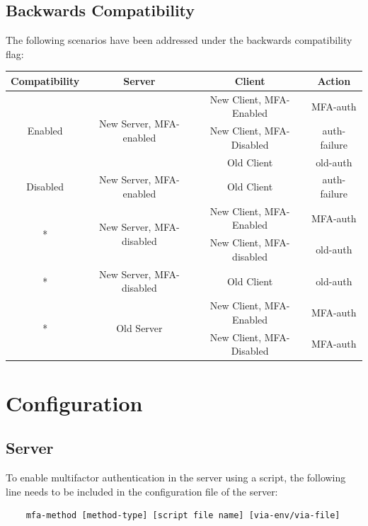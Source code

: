 \documentclass[11pt,oneside]{book}
\begin{document}
\subsection{Backwards Compatibility}
The following scenarios have been addressed under the backwards compatibility flag:\\

{
    \centering
    \begin{tabular}{|c|c|c|c|}
        \hline
        \textbf{Compatibility} & \textbf{Server} & \textbf{Client} & \textbf{Action} \\

        \hline
        \multirow{3}{*}{Enabled} & \multirow{3}{*}{New Server, MFA-enabled} & New Client, MFA-Enabled & MFA-auth\\
                                 & & New Client, MFA-Disabled & auth-failure\\
                                 & & Old Client & old-auth\\
        \hline
        Disabled & New Server, MFA-enabled & Old Client & auth-failure\\

        \hline
        \multirow{2}{*}{*} & \multirow{2}{*}{New Server, MFA-disabled} & New Client, MFA-Enabled & MFA-auth\\
                           & & New Client, MFA-disabled & old-auth\\
        \hline
        * & New Server, MFA-disabled & Old Client & old-auth\\
        \hline
        \multirow{2}{*}{*} & \multirow{2}{*}{Old Server} & New Client, MFA-Enabled & MFA-auth\\
                           & & New Client, MFA-Disabled & MFA-auth\\
        \hline
    \end{tabular}
}

\section{Configuration}
\subsection{Server}
To enable multifactor authentication in the server using a script, the following line needs to be
included in the configuration file of the server:

\begin{verbatim}
    mfa-method [method-type] [script file name] [via-env/via-file]
\end{verbatim}
\end{document}
